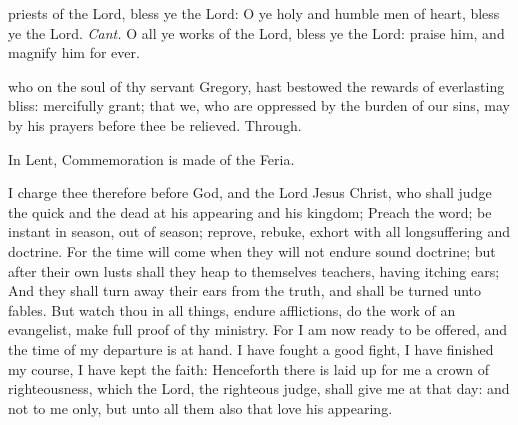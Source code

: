 \vspace{-0.25\baselineskip}

\introit
{} priests of the Lord, bless ye the Lord: O ye holy and humble
men of heart, bless ye the Lord. \textit{Cant.} O all ye works of the Lord, bless ye the Lord: praise him, and magnify him for ever.

\vspace{-0.25\baselineskip}

\collect
{} who on the soul of thy servant Gregory, hast bestowed the rewards of everlasting bliss: mercifully grant; that we, who are oppressed by the burden of our sins, may by his prayers before thee be relieved. Through.
\begin{rubric}
    In Lent, Commemoration is made of the Feria.%
\end{rubric}

\vspace{-0.25\baselineskip}

 I charge thee therefore before God, and the Lord Jesus Christ, who shall judge the quick and the dead at his appearing and his kingdom; Preach the word; be instant in season, out of season; reprove, rebuke, exhort with all longsuffering and doctrine. For the time will come when they will not endure sound doctrine; but after their own lusts shall they heap to themselves teachers, having itching ears; And they shall turn away their ears from the truth, and shall be turned unto fables. But watch thou in all things, endure afflictions, do the work of an evangelist, make full proof of thy ministry. For I am now ready to be offered, and the time of my departure is at hand. I have fought a good fight, I have finished my course, I have kept the faith: Henceforth there is laid up for me a crown of righteousness, which the Lord, the righteous judge, shall give me at that day: and not to me only, but unto all them also that love his appearing.


